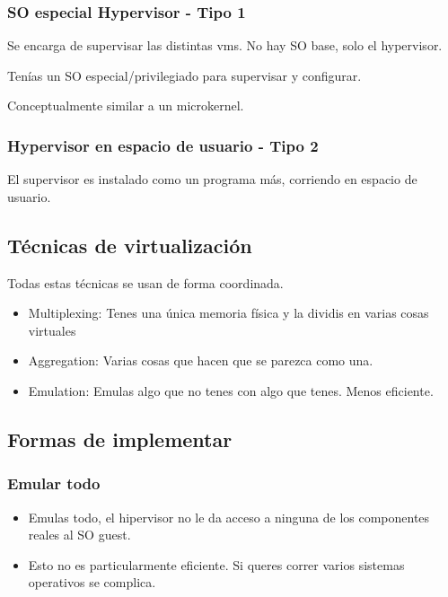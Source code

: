 \documentclass{article}
\begin{document}
\subsubsection{SO especial Hypervisor - Tipo
1}\label{so-especial-hypervisor---tipo-1}

Se encarga de supervisar las distintas vms. No hay SO base, solo el
hypervisor.

Tenías un SO especial/privilegiado para supervisar y configurar.

Conceptualmente similar a un microkernel.

\subsubsection{Hypervisor en espacio de usuario - Tipo
2}\label{hypervisor-en-espacio-de-usuario---tipo-2}

El supervisor es instalado como un programa más, corriendo en espacio de
usuario.

\subsection{Técnicas de
virtualización}\label{tuxe9cnicas-de-virtualizaciuxf3n}

Todas estas técnicas se usan de forma coordinada.

\begin{itemize}
\item
  Multiplexing: Tenes una única memoria física y la dividis en varias
  cosas virtuales
\item
  Aggregation: Varias cosas que hacen que se parezca como una.
\item
  Emulation: Emulas algo que no tenes con algo que tenes. Menos
  eficiente.
\end{itemize}

\subsection{Formas de implementar}\label{formas-de-implementar}

\subsubsection{Emular todo}\label{emular-todo}

\begin{itemize}
\item
  Emulas todo, el hipervisor no le da acceso a ninguna de los
  componentes reales al SO guest.
\item
  Esto no es particularmente eficiente. Si queres correr varios sistemas
  operativos se complica.
\end{itemize}
\end{document}
